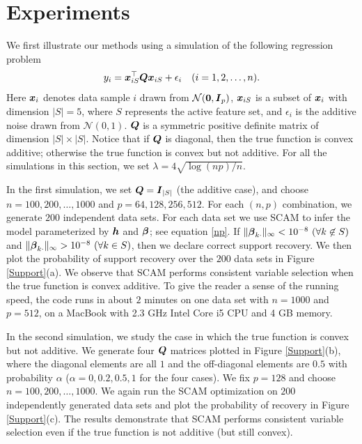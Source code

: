 \section{Experiments}
We first illustrate our methods using a simulation of the following regression problem
\begin{equation}\nonumber
         y_i = \boldsymbol{x}_{iS}^{\top}\boldsymbol{Q}\boldsymbol{x}_{iS} + \epsilon_i \quad (i=1,2,\ldots,n).
\end{equation}
Here $\boldsymbol{x}_{i}$ denotes data sample $i$ drawn from $\mathcal{N}(\boldsymbol{0},\boldsymbol{I}_{p})$, 
$\boldsymbol{x}_{iS}$ is a subset of $\boldsymbol{x}_i$ with dimension $|S|=5$, where $S$ represents the active feature set, and 
$\epsilon_i$ is the additive noise drawn from $\mathcal{N}(0,1)$. 
$\boldsymbol{Q}$ is a symmetric positive definite matrix of dimension $|S|\times{}|S|$. 
Notice that if $\boldsymbol{Q}$ is diagonal, then the true function is convex additive; otherwise the true function is convex but not additive.
For all the simulations in this section, we set $\lambda=4\sqrt{{\log(np)}/{n}}$.

In the first simulation, we set $\boldsymbol{Q}=\boldsymbol{I}_{|S|}$ (the additive
case), and choose $n=100, 200,\ldots,1000$ and $p=64,128,256,512$.
For each $(n,p)$ combination, we generate $200$ independent data
sets. For each data set we use SCAM to infer the model parameterized
by $\boldsymbol{h}$ and $\boldsymbol{\beta}$; see equation \eqref{np}. If
$\|\bds{\beta}_{k\cdot}\|_{\infty}<10^{-8}\ (\forall k\not\in{}S)$ and
$\|\bds{\beta}_{k\cdot}\|_{\infty}>10^{-8}\ (\forall k\in{}S)$, then
we declare correct support recovery. We then plot the probability of
support recovery over the $200$ data sets in Figure \ref{Support}(a).  We
observe that SCAM performs consistent variable selection when the true
function is convex additive.  
To give the reader a
sense of the running speed, the code runs in about $2$ minutes on one
data set with $n=1000$ and $p=512$, on a MacBook with 2.3 GHz Intel
Core i5 CPU and 4 GB memory.

In the second simulation, we study the case in which the true function
is convex but not additive. We generate four $\boldsymbol{Q}$ matrices
plotted in Figure \ref{Support}(b), where the diagonal elements are all $1$ and
the off-diagonal elements are $0.5$ with probability $\alpha$
($\alpha=0,0.2,0.5,1$ for the four cases). We fix $p=128$ and choose
$n=100,200,\ldots,1000$. We again run the SCAM optimization on $200$
independently generated data sets and plot the probability of recovery
in Figure \ref{Support}(c). The results demonstrate that SCAM performs
consistent variable selection even if the true function is not additive (but
still convex).

